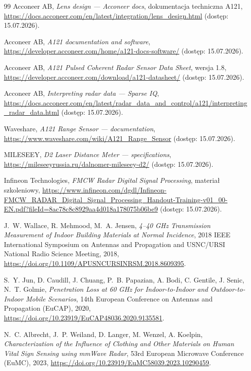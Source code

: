 \documentclass[12pt,a4paper,oneside]{report}
\begin{document}
\begin{thebibliography}{99}
Acconeer AB, \emph{Lens design --- Acconeer docs}, dokumentacja techniczna
A121, \url{https://docs.acconeer.com/en/latest/integration/lens_design.html}
(dostęp: 15.07.2026).

Acconeer AB, \emph{A121 documentation and software},
\url{https://developer.acconeer.com/home/a121-docs-software/}
(dostęp: 15.07.2026).

Acconeer AB, \emph{A121 Pulsed Coherent Radar Sensor Data Sheet}, wersja 1.8,
\url{https://developer.acconeer.com/download/a121-datasheet/}
(dostęp: 15.07.2026).

Acconeer AB, \emph{Interpreting radar data --- Sparse IQ},
\url{https://docs.acconeer.com/en/latest/radar_data_and_control/a121/interpreting_radar_data.html}
(dostęp: 15.07.2026).

Waveshare, \emph{A121 Range Sensor --- documentation},
\url{https://www.waveshare.com/wiki/A121_Range_Sensor}
(dostęp: 15.07.2026).

MILESEEY, \emph{D2 Laser Distance Meter --- specifications},
\url{https://mileseeyrussia.ru/dalnomer-mileseey-d2/}
(dostęp: 15.07.2026).

Infineon Technologies, \emph{FMCW Radar Digital Signal Processing}, materiał
szkoleniowy,
\url{https://www.infineon.com/dgdl/Infineon-FMCW_RADAR_Digital_Signal_Processing_Handout-Training-v01_00-EN.pdf?fileId=8ac78c8c8929aa4d018a178075b06be9}
(dostęp: 15.07.2026).

J.~W. Wallace, R. Mehmood, M.~A. Jensen, \emph{4--40 GHz Transmission
Measurement of Indoor Building Materials at Normal Incidence}, 2018 IEEE
International Symposium on Antennas and Propagation and USNC/URSI National
Radio Science Meeting, 2018,
\url{https://doi.org/10.1109/APUSNCURSINRSM.2018.8609395}.

S.~Y. Jun, D. Caudill, J. Chuang, P.~B. Papazian, A. Bodi, C. Gentile,
J. Senic, N.~T. Golmie, \emph{Penetration Loss at 60 GHz for
Indoor-to-Indoor and Outdoor-to-Indoor Mobile Scenarios}, 14th European
Conference on Antennas and Propagation (EuCAP), 2020,
\url{https://doi.org/10.23919/EuCAP48036.2020.9135581}.

N.~C. Albrecht, J.~P. Weiland, D. Langer, M. Wenzel, A. Koelpin,
\emph{Characterization of the Influence of Clothing and Other Materials on
Human Vital Sign Sensing using mmWave Radar}, 53rd European Microwave
Conference (EuMC), 2023,
\url{https://doi.org/10.23919/EuMC58039.2023.10290459}.


\end{thebibliography}
\end{document}
